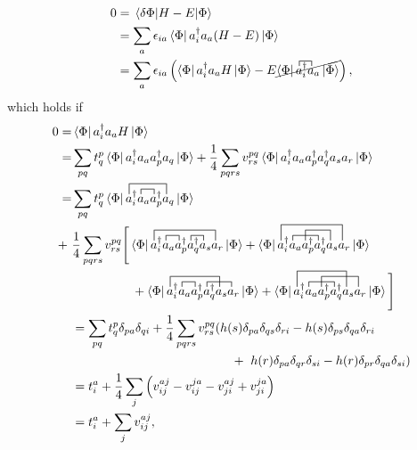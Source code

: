 \documentclass[10pt]{article}
\begin{document}
\begin{align}
0
&=
\mel{\delta\Phi}{H-E}{\Phi}
\\
&=
\sum_a\epsilon_{ia}\bra{\Phi}a^\dagger_ia_a(H-E)\ket{\Phi}
\\
&=
\sum_a\epsilon_{ia}
\left(
\bra{\Phi}a^\dagger_ia_aH\ket{\Phi}
-
E\cancel{\bra{\Phi}
\contraction[1ex]{}{a}{^\dagger_i}{a}
a^\dagger_ia_a
\ket{\Phi}}
\right),
\end{align}
which holds if
\begin{align}
0
=&
\bra{\Phi}a^\dagger_ia_aH\ket{\Phi}
\\
=&
\sum_{pq}t^p_q
\bra{\Phi}a^\dagger_ia_aa^\dagger_pa_q\ket{\Phi}
+
\frac{1}{4}\sum_{pqrs}v^{pq}_{rs}
\bra{\Phi}a^\dagger_ia_aa^\dagger_pa^\dagger_qa_sa_r\ket{\Phi}
\\
=&
\sum_{pq}t^p_q
\bra{\Phi}
\contraction[2ex]{}{a}{^\dagger_ia_aa^\dagger_p}{a}
\contraction[1ex]{a^\dagger_i}{a}{_a}{a}
a^\dagger_ia_aa^\dagger_pa_q
\ket{\Phi}
\nonumber
\\
+\ &
\frac{1}{4}
\sum_{pqrs}v^{pq}_{rs}
\Bigg{[}
\bra{\Phi}
\contraction[2ex]{}{a}{^\dagger_ia_aa^\dagger_pa^\dagger_qa_s}{a}
\contraction[1ex]{a^\dagger_i}{a}{_a}{a}
\contraction[1ex]{a^\dagger_ia_aa^\dagger_p}{a}{^\dagger_q}{a}
a^\dagger_ia_aa^\dagger_pa^\dagger_qa_sa_r
\ket{\Phi}
+
\bra{\Phi}
\contraction[3ex]{}{a}{^\dagger_ia_aa^\dagger_pa^\dagger_qa_s}{a}
\contraction[1ex]{a^\dagger_i}{a}{_aa^\dagger_p}{a}
\contraction[2ex]{a^\dagger_ia_a}{a}{^\dagger_pa^\dagger_q}{a}
a^\dagger_ia_aa^\dagger_pa^\dagger_qa_sa_r
\ket{\Phi}
\nonumber
\\
& \hspace{17mm} +
\bra{\Phi}
\contraction[2ex]{}{a}{^\dagger_ia_aa^\dagger_pa^\dagger_q}{a}
\contraction[1ex]{a^\dagger_i}{a}{_a}{a}
\contraction[1ex]{a^\dagger_ia_aa^\dagger_p}{a}{^\dagger_qa_s}{a}
a^\dagger_ia_aa^\dagger_pa^\dagger_qa_sa_r
\ket{\Phi}
+
\bra{\Phi}
\contraction[3ex]{}{a}{^\dagger_ia_aa^\dagger_pa^\dagger_q}{a}
\contraction[1ex]{a^\dagger_i}{a}{_aa^\dagger_p}{a}
\contraction[2ex]{a^\dagger_ia_a}{a}{^\dagger_pa^\dagger_qa_s}{a}
a^\dagger_ia_aa^\dagger_pa^\dagger_qa_sa_r
\ket{\Phi}
\Bigg{]}
\\
&=
\sum_{pq}t^p_q\delta_{pa}\delta_{qi}
\nonumber
+
\frac{1}{4}\sum_{pqrs}v^{pq}_{rs}
(
h(s)\delta_{pa}\delta_{qs}\delta_{ri}
-
h(s)\delta_{ps}\delta_{qa}\delta_{ri}
\nonumber
\\
& \hspace{45mm} +\
h(r)\delta_{pa}\delta_{qr}\delta_{si}
-
h(r)\delta_{pr}\delta_{qa}\delta_{si}
)
\\
&=
t^a_i
+
\frac{1}{4}
\sum_j
\left(v^{aj}_{ij}-v^{ja}_{ij}-v^{aj}_{ji}+v^{ja}_{ji}\right)
\\
&=
t^a_i
+
\sum_jv^{aj}_{ij},
\end{align}
\end{document}
